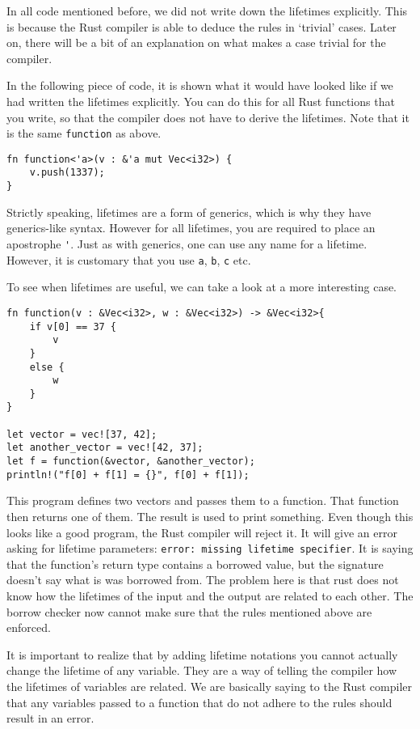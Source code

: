 In all code mentioned before, we did not write down the lifetimes explicitly. This is because the Rust compiler is able to deduce the rules in `trivial' cases. Later on, there will be a bit of an explanation on what makes a case trivial for the compiler.

In the following piece of code, it is shown what it would have looked like if we had written the lifetimes explicitly. You can do this for all Rust functions that you write, so that the compiler does not have to derive the lifetimes. Note that it is the same \verb|function| as above. 

\begin{verbatim}
fn function<'a>(v : &'a mut Vec<i32>) {
    v.push(1337);
}
\end{verbatim}

Strictly speaking, lifetimes are a form of generics, which is why they have generics-like syntax.  However for all lifetimes, you are required to place an apostrophe \verb|'|. Just as with generics, one can use any name for a lifetime. However, it is customary that you use \verb|a|, \verb|b|, \verb|c| etc. 

To see when lifetimes are useful, we can take a look at a more interesting case. 

\begin{verbatim}
fn function(v : &Vec<i32>, w : &Vec<i32>) -> &Vec<i32>{
    if v[0] == 37 {
        v
    }
    else {
        w
    }
}

let vector = vec![37, 42];
let another_vector = vec![42, 37];
let f = function(&vector, &another_vector);
println!("f[0] + f[1] = {}", f[0] + f[1]);
\end{verbatim}

This program defines two vectors and passes them to a function. That function then returns one of them. The result is used to print something. Even though this looks like a good program, the Rust compiler will reject it. It will give an error asking for lifetime parameters: \texttt{error: missing lifetime specifier}. It is saying that the function's return type contains a borrowed value, but the signature doesn't say what is was borrowed from. The problem here is that rust does not know how the lifetimes of the input and the output are related to each other. The borrow checker now cannot make sure that the rules mentioned above are enforced. 

It is important to realize that by adding lifetime notations you cannot actually change the lifetime of any variable. They are a way of telling the compiler how the lifetimes of variables are related. We are basically saying to the Rust compiler that any variables passed to a function that do not adhere to the rules should result in an error. 

